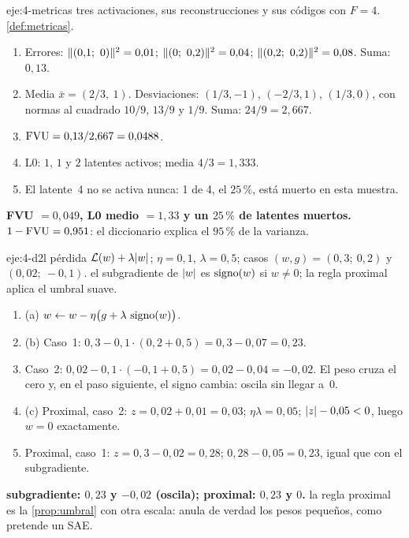 \begin{solucion}{eje:4-metricas}
\datos tres activaciones, sus reconstrucciones y sus códigos con $F=4$.
\planteamiento \cref{def:metricas}.
\pasos
\begin{enumerate}[label=\arabic*.]
  \item Errores: $\norm{(0{,}1;\allowbreak\ 0)}^{2}=0{,}01$; $\norm{(0;\allowbreak\ 0{,}2)}^{2}=0{,}04$; $\norm{(0{,}2;\allowbreak\ 0{,}2)}^{2}=0{,}08$. Suma: $0{,}13$.
  \item Media $\bar x=(2/3,\ 1)$. Desviaciones: $(1/3,-1)$, $(-2/3,1)$, $(1/3,0)$, con normas al cuadrado $10/9$, $13/9$ y $1/9$. Suma: $24/9=2{,}667$.
  \item $\operatorname{FVU}=0{,}13/2{,}667=0{,}0488$.
  \item L0: $1$, $1$ y $2$ latentes activos; media $4/3=1{,}333$.
  \item El latente~4 no se activa nunca: 1 de 4, el $25\,\%$, está muerto en esta muestra.
\end{enumerate}
\resultado \textbf{FVU $=0{,}049$, L0 medio $=1{,}33$ y un $25\,\%$ de latentes muertos.}
\comprobacion $1-\operatorname{FVU}=0{,}951$: el diccionario explica el $95\,\%$ de la varianza.
\end{solucion}

\begin{solucion}{eje:4-d2l}
\datos pérdida $\mathcal{L}(w)+\lambda\lvert w\rvert$; $\eta=0{,}1$, $\lambda=0{,}5$; casos $(w,g)=(0{,}3;\allowbreak\ 0{,}2)$ y $(0{,}02;\allowbreak\ -0{,}1)$.
\planteamiento el subgradiente de $\lvert w\rvert$ es $\operatorname{signo}(w)$ si $w\neq 0$; la regla proximal aplica el umbral suave.
\pasos
\begin{enumerate}[label=\arabic*.]
  \item (a) $w\leftarrow w-\eta\bigl(g+\lambda\,\operatorname{signo}(w)\bigr)$.
  \item (b) Caso~1: $0{,}3-0{,}1\cdot(0{,}2+0{,}5)=0{,}3-0{,}07=0{,}23$.
  \item Caso~2: $0{,}02-0{,}1\cdot(-0{,}1+0{,}5)=0{,}02-0{,}04=-0{,}02$. El peso cruza el cero y, en el paso siguiente, el signo cambia: oscila sin llegar a~0.
  \item (c) Proximal, caso~2: $z=0{,}02+0{,}01=0{,}03$; $\eta\lambda=0{,}05$; $\lvert z\rvert-0{,}05<0$, luego $w=0$ exactamente.
  \item Proximal, caso~1: $z=0{,}3-0{,}02=0{,}28$; $0{,}28-0{,}05=0{,}23$, igual que con el subgradiente.
\end{enumerate}
\resultado \textbf{subgradiente: $0{,}23$ y $-0{,}02$ (oscila); proximal: $0{,}23$ y $0$.}
\comprobacion la regla proximal es la \cref{prop:umbral} con otra escala: anula de verdad los pesos pequeños, como pretende un SAE.
\end{solucion}

